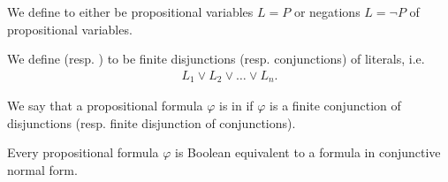 \begin{definition}\label{def:conjunctive_normal_form}
  We define  to either be propositional variables $L = P$ or negations $L = \neg P$ of propositional variables.

  We define  (resp. ) to be finite disjunctions (resp. conjunctions) of literals, i.e.
  \begin{align*}
    L_1 \lor L_2 \lor \ldots \lor L_n.
  \end{align*}

  We say that a propositional formula $\varphi$ is in  if $\varphi$ is a finite conjunction of disjunctions (resp. finite disjunction of conjunctions).
\end{definition}

\begin{proposition}\label{thm:conjunctive_normal_form_reduction}
  Every propositional formula $\varphi$ is Boolean equivalent to a formula in conjunctive normal form.
\end{proposition}

